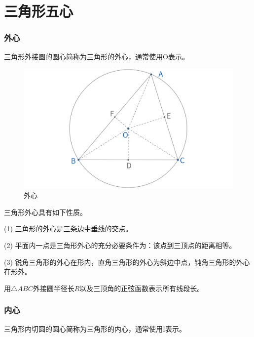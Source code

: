\part{三角形五心}
\section{外心}

\begin{definition}[外心]
    三角形外接圆的圆心简称为三角形的外心，通常使用O表示。
\end{definition}

\begin{figure}[H]
    \centering
    \includegraphics[width=0.8\linewidth]{figures/三角形五心/外心.png}
    \caption{外心}
\end{figure}

\begin{proposition}[外心性质]
    三角形外心具有如下性质。
    
    (1) 三角形的外心是三条边中垂线的交点。

    (2) 平面内一点是三角形外心的充分必要条件为：该点到三顶点的距离相等。

    (3) 锐角三角形的外心在形内，直角三角形的外心为斜边中点，钝角三角形的外心在形外。
\end{proposition}

\begin{exercise}
    用$\triangle ABC$外接圆半径长$R$以及三顶角的正弦函数表示所有线段长。
\end{exercise}


\newpage 
\section{内心}

\begin{definition}[内心]
    三角形内切圆的圆心简称为三角形的内心，通常使用I表示。
\end{definition}

